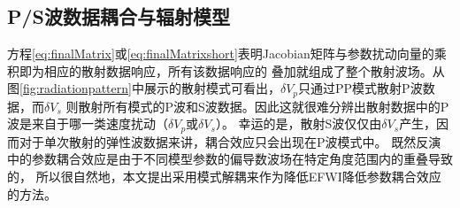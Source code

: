 \subsection{P/S波数据耦合与辐射模型}
方程\eqref{eq:finalMatrix}或\eqref{eq:finalMatrixshort}表明Jacobian矩阵与参数扰动向量的乘积即为相应的散射数据响应，所有该数据响应的
叠加就组成了整个散射波场。从图\ref{fig:radiationpattern}中展示的散射模式可看出，$\delta V_p$只通过PP模式散射P波数据，而$\delta V_s$
则散射所有模式的P波和S波数据。因此这就很难分辨出散射数据中的P波是来自于哪一类速度扰动（$\delta V_p$或$\delta V_s$）。
幸运的是，散射S波仅仅由$\delta V_s$产生，因而对于单次散射的弹性波数据来讲，耦合效应只会出现在P波模式中。
既然反演中的参数耦合效应是由于不同模型参数的偏导数波场在特定角度范围内的重叠导致的\cite{tarantola:1986,operto2013guided}，
所以很自然地，本文提出采用模式解耦来作为降低EFWI降低参数耦合效应的方法。
